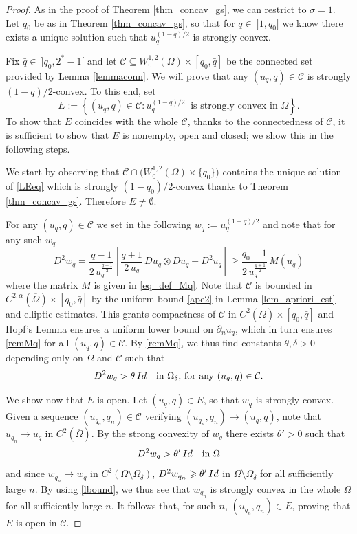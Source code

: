 \documentclass[12pt]{amsart}
\numberwithin{equation}{section}
\theoremstyle{plain}
\theoremstyle{plain}
\theoremstyle{plain}
\theoremstyle{definition}
\newcommand{\beq}{\begin{equation}}
\newcommand{\eeq}{\end{equation}}
\renewcommand{\ge}{\geqslant}
\newcommand{\mc}[1]{\mathcal{#1}}
\begin{document}
\begin{proof}
As in the proof of Theorem \ref{thm_concav_gs}, we can restrict to $\sigma=1$. Let $q_0$ be as in Theorem \ref{thm_concav_gs}, so that for $q \in\ ]1, q_0]$ we know there exists a unique solution such that $u_q^{(1-q)/2}$ is strongly convex.
 
 Fix $\bar q\in \ ]q_0, 2^*-1[$ and let ${\mathcal C}\subseteq W^{1, 2}_0(\Omega)\times [q_0, \bar q]$ be the connected set provided by Lemma \ref{lemmaconn}. 
We will prove that any $(u_q, q)\in {\mathcal C}$ is strongly $(1-q)/2$-convex. To this end, set
 \[
 E:=\left\{ (u_q, q)\in {\mathcal C}: u_q^{(1-q)/2}\ \text{\ is strongly convex in $\Omega$}\right\}.
 \]
To show that $E$ coincides with the whole $\mc{C}$, thanks to the connectedness of ${\mathcal C}$, it is sufficient to show that $E$ is nonempty, open and closed; we show this in the following steps.

 We start by observing that ${\mathcal C}\cap \big( W^{1,2}_0(\Omega)\times\{q_0\}\big)$ contains the unique solution of \eqref{LEeq} which is strongly $(1-q_0)/2$-convex thanks to Theorem \ref{thm_concav_gs}. 
 Therefore $E\ne \emptyset$. 

For any $(u_q, q)\in {\mathcal C}$ we set in the following $w_q:=u_q^{(1-q)/2}$ and note that for any such $w_q$
 \[
 D^2 w_q=\frac{q-1}{2\, u_q^{\frac{q+1}{2}}}\left[\frac{q+1}{2\, u_q}\, D u_q\otimes D u_q-D^2 u_q\right]\ge \frac{q_0-1}{2\, u_q^{\frac{q+1}{2}}}\, M(u_q)
 \]
where the matrix $M$ is given in \eqref{eq_def_Mq}. 
Note that ${\mathcal C}$ is bounded in $C^{2, \alpha}(\overline\Omega)\times [q_0, \bar q]$ by the uniform bound \eqref{ape2} in Lemma \ref{lem_apriori_est} and elliptic estimates. 
This grants compactness of ${\mathcal C}$ in $C^2(\overline{\Omega})\times [q_0, \bar q]$ and Hopf's Lemma ensures a uniform lower bound on $\partial_n u_q$, which in turn ensures \eqref{remMq} for all $(u_q, q)\in {\mathcal C}$. By \eqref{remMq}, we thus find constants $\theta, \delta>0$ depending only on $\Omega$ and ${\mathcal C}$ such that 
\beq
\label{lbound}
D^2 w_q> \theta\, {\rm Id} \quad \text{in $\Omega_\delta$, for any $(u_q, q)\in {\mathcal C}$}.
\eeq

We show now that $E$ is open. Let $(u_q, q)\in E$, so that $w_q$ is strongly convex.
Given a sequence $(u_{q_n}, q_n)\in {\mathcal C}$ verifying $(u_{q_n}, q_n)\to (u_q, q)$, note that $u_{q_n}\to u_q$ in $C^2(\overline{\Omega})$. By the strong convexity of $w_q$ there exists $\theta'>0$ such that 
\[
D^2 w_q>\theta'\, {\rm Id} \quad \text{in $\Omega$}
\]
and since $w_{q_n}\to w_q$ in $C^2(\Omega\setminus\Omega_\delta)$, $D^2 w_{q_n}\ge \theta'\, {\rm Id}$ in $\Omega\setminus\Omega_\delta$ for all sufficiently large $n$. 
By using \eqref{lbound}, we thus see that $w_{q_n}$ is strongly convex in the whole $\Omega$ for all sufficiently large $n$. It follows that, for such $n$, $(u_{q_n}, q_n)\in E$, proving that $E$ is open in ${\mathcal C}$.


\end{proof}
\end{document}
